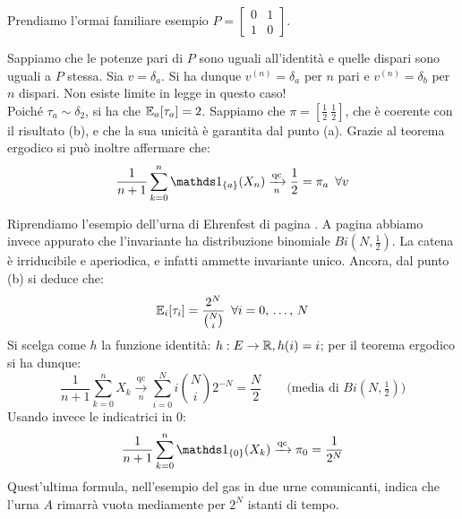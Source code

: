 \begin{ese}
	Prendiamo l'ormai familiare esempio $P=\left[\begin{smallmatrix}0 & 1 \\ 1 & 0\end{smallmatrix}\right]$.
	\begin{figure}[H]
		\centering
	\end{figure}
	Sappiamo che le potenze pari di $P$ sono uguali all'identità e quelle dispari sono uguali a $P$ stessa.
	Sia $v = \delta_a$. Si ha dunque $v^{(n)} = \delta_a$ per $n$ pari e $v^{(n)} = \delta_b$ per $n$ dispari.
	Non esiste limite in legge in questo caso! \\
	Poiché $\tau_a \sim \delta_2$, si ha che $\mathbb E_a[\tau_a] = 2$.
	Sappiamo che $\pi = [\frac 1 2 \ \frac 1 2]$, che è coerente con il risultato (b), e che la sua unicità è garantita dal punto (a).
	Grazie al teorema ergodico si può inoltre affermare che:
	$$ \frac{1}{n+1} \sum_{k=0}^n \Ind_{\{a\}}(X_n) \xrightarrow[n]{\text{qc}} \frac 1 2 = \pi_a \enspace \forall v$$
\end{ese}
\begin{ese}
	Riprendiamo l'esempio dell'urna di Ehrenfest di pagina \pageref{urna-ehren}.
	A pagina \pageref{urna-binomiale} abbiamo invece appurato che l'invariante ha distribuzione binomiale $Bi\left(N, \frac 1 2\right)$.
	La catena è irriducibile e aperiodica, e infatti ammette invariante unico.
	Ancora, dal punto (b) si deduce che:
	$$\mathbb E_i[\tau_i] = \dfrac{2^N}{\binom N i} \enspace \forall i = 0,\, \dots, \, N$$
	Si scelga come $h$ la funzione identità: $h: E \to \mathbb R, h(i) = i$; per il teorema ergodico si ha dunque:
	$$ \frac{1}{n+1} \sum_{k=0}^n X_k \xrightarrow[n]{\text{qc}} \sum_{i=0}^N i \binom N i 2^{-N} = \frac N 2 \qquad \text{(media di $Bi(N,\tfrac 1 2)$)}$$
	Usando invece le indicatrici in 0:
	$$ \frac{1}{n+1} \sum_{k=0}^n \Ind_{\{0\}}(X_k) \xrightarrow{\text{qc}} \pi_0 = \frac{1}{2^N} $$
	Quest'ultima formula, nell'esempio del gas in due urne comunicanti, indica che l'urna $A$ rimarrà vuota mediamente per $2^N$ istanti di tempo.
\end{ese}


